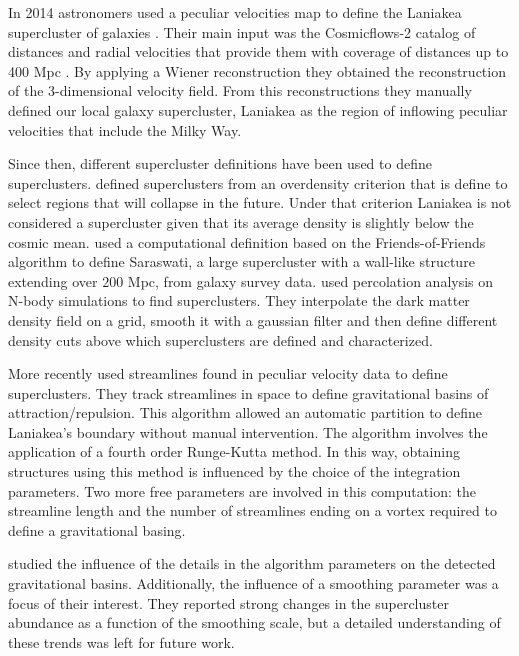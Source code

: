 \documentclass[usenatbib]{mnras}
\begin{document}
In 2014 astronomers used a peculiar velocities map  to 
define the Laniakea supercluster of galaxies
\citep{2014Natur.513...71T}.  
Their main input was the Cosmicflows-2 catalog of distances and radial
velocities that provide them with coverage of distances up to 400 Mpc
\citep{2013AJ....146...86T}. 
By applying a Wiener reconstruction  \citep{Zaroubi_1999} they obtained the
reconstruction of the 3-dimensional velocity field. 
From this reconstructions they manually defined our local galaxy supercluster, Laniakea as the region of inflowing peculiar velocities that include the Milky Way. 

Since then, different supercluster definitions have been used to define superclusters. 
\cite{2015A&A...575L..14C} defined superclusters from an overdensity criterion that is define to select regions that will collapse in the future.
Under that criterion Laniakea is not considered a supercluster given that its average density is slightly below the cosmic mean.
\cite{Bagchi_2017} used a computational definition based on the Friends-of-Friends algorithm to define Saraswati, a large supercluster with a wall-like structure extending over $200$ Mpc, from galaxy survey data.
\cite{Einasto_2019} used percolation analysis on N-body simulations to find superclusters.
They interpolate the dark matter density field on a grid, smooth it with a gaussian filter and then define different density cuts above which superclusters are defined and characterized. 

More recently \cite{Dupuy_2019} used streamlines found in peculiar velocity data to define 
superclusters. 
They track streamlines in space to define gravitational basins of attraction/repulsion.
This algorithm allowed an automatic partition to define Laniakea's boundary without manual intervention.
The algorithm involves the application of a
fourth order Runge-Kutta method. 
In this way, obtaining structures using this method is influenced by the choice of the integration parameters. 
Two more free parameters are involved in this computation: the streamline length and the number of streamlines ending on a vortex required to define a gravitational basing.

\cite{Dupuy_2020} studied the influence of the details in
the algorithm parameters on the detected gravitational basins.
Additionally, the
influence of a smoothing parameter was a focus of their interest. 
They reported strong changes in the supercluster abundance as a function of the smoothing scale, but a detailed understanding of these trends was left for future work.
\end{document}
